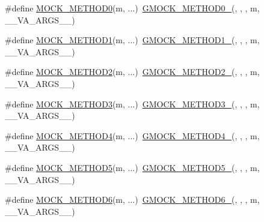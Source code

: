 \begin{DoxyCompactItemize}
\item 
\#define \hyperlink{gmock-generated-function-mockers_8h_a411c69e9d489d590480f728d365ae450}{M\+O\+C\+K\+\_\+\+M\+E\+T\+H\+O\+D0}(m, ...)~\hyperlink{gmock-generated-function-mockers_8h_ae0d290ffa58d7c624b2e3487ba1252f4}{G\+M\+O\+C\+K\+\_\+\+M\+E\+T\+H\+O\+D0\+\_\+}(, , , m, \+\_\+\+\_\+\+V\+A\+\_\+\+A\+R\+G\+S\+\_\+\+\_\+)
\item 
\#define \hyperlink{gmock-generated-function-mockers_8h_ac49d366be035ee87b73264a29059cdc7}{M\+O\+C\+K\+\_\+\+M\+E\+T\+H\+O\+D1}(m, ...)~\hyperlink{gmock-generated-function-mockers_8h_a1bc0012d62440dda77208dabdf4925c9}{G\+M\+O\+C\+K\+\_\+\+M\+E\+T\+H\+O\+D1\+\_\+}(, , , m, \+\_\+\+\_\+\+V\+A\+\_\+\+A\+R\+G\+S\+\_\+\+\_\+)
\item 
\#define \hyperlink{gmock-generated-function-mockers_8h_ab3fb7d97f21dc99205db38a14df4a1c4}{M\+O\+C\+K\+\_\+\+M\+E\+T\+H\+O\+D2}(m, ...)~\hyperlink{gmock-generated-function-mockers_8h_a885295ca6bebb15efb3fc786218c5d47}{G\+M\+O\+C\+K\+\_\+\+M\+E\+T\+H\+O\+D2\+\_\+}(, , , m, \+\_\+\+\_\+\+V\+A\+\_\+\+A\+R\+G\+S\+\_\+\+\_\+)
\item 
\#define \hyperlink{gmock-generated-function-mockers_8h_af11ebf7fafb231778846dba77725cfdd}{M\+O\+C\+K\+\_\+\+M\+E\+T\+H\+O\+D3}(m, ...)~\hyperlink{gmock-generated-function-mockers_8h_af7c77ba511c631de02bb8c45a6ed3045}{G\+M\+O\+C\+K\+\_\+\+M\+E\+T\+H\+O\+D3\+\_\+}(, , , m, \+\_\+\+\_\+\+V\+A\+\_\+\+A\+R\+G\+S\+\_\+\+\_\+)
\item 
\#define \hyperlink{gmock-generated-function-mockers_8h_a111d70ee62b09089ec3cd7d6662e5cd2}{M\+O\+C\+K\+\_\+\+M\+E\+T\+H\+O\+D4}(m, ...)~\hyperlink{gmock-generated-function-mockers_8h_ab6430f2cfad9de4aca5258ea559294bb}{G\+M\+O\+C\+K\+\_\+\+M\+E\+T\+H\+O\+D4\+\_\+}(, , , m, \+\_\+\+\_\+\+V\+A\+\_\+\+A\+R\+G\+S\+\_\+\+\_\+)
\item 
\#define \hyperlink{gmock-generated-function-mockers_8h_a9b83bed95e89664e61d3a36174de0052}{M\+O\+C\+K\+\_\+\+M\+E\+T\+H\+O\+D5}(m, ...)~\hyperlink{gmock-generated-function-mockers_8h_a9e3ecd392499ab19a4a6d3adcabf56f6}{G\+M\+O\+C\+K\+\_\+\+M\+E\+T\+H\+O\+D5\+\_\+}(, , , m, \+\_\+\+\_\+\+V\+A\+\_\+\+A\+R\+G\+S\+\_\+\+\_\+)
\item 
\#define \hyperlink{gmock-generated-function-mockers_8h_add8f8f786444c2c85ac67f550dbde5a6}{M\+O\+C\+K\+\_\+\+M\+E\+T\+H\+O\+D6}(m, ...)~\hyperlink{gmock-generated-function-mockers_8h_ad0ca7f6973a076d0af4c953f8ed91842}{G\+M\+O\+C\+K\+\_\+\+M\+E\+T\+H\+O\+D6\+\_\+}(, , , m, \+\_\+\+\_\+\+V\+A\+\_\+\+A\+R\+G\+S\+\_\+\+\_\+)
\item 

\end{DoxyCompactItemize}
